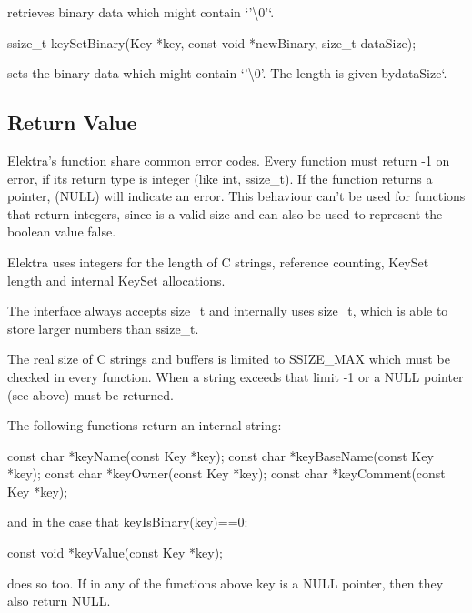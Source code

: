 retrieves binary data which might contain `'\textbackslash{}0'`. \begin{DoxyVerb}    ssize_t keySetBinary(Key *key, const void *newBinary, size_t dataSize);
\end{DoxyVerb}


sets the binary data which might contain `'\textbackslash{}0'{\ttfamily . The length is given by}data\+Size`.

\subsection*{Return Value}

Elektra's function share common error codes. Every function must return {\ttfamily -\/1} on error, if its return type is integer (like {\ttfamily int}, {\ttfamily ssize\+\_\+t}). If the function returns a pointer, {} ({\ttfamily N\+U\+L\+L}) will indicate an error. This behaviour can't be used for functions that return integers, since {} is a valid size and can also be used to represent the boolean value {\ttfamily false}.

Elektra uses integers for the length of C strings, reference counting, {\ttfamily Key\+Set} length and internal {\ttfamily Key\+Set} allocations.

The interface always accepts {\ttfamily size\+\_\+t} and internally uses {\ttfamily size\+\_\+t}, which is able to store larger numbers than {\ttfamily ssize\+\_\+t}.

The real size of C strings and buffers is limited to {\ttfamily S\+S\+I\+Z\+E\+\_\+\+M\+A\+X} which must be checked in every function. When a string exceeds that limit {\ttfamily -\/1} or a {\ttfamily N\+U\+L\+L} pointer (see above) must be returned.

The following functions return an internal string\+: \begin{DoxyVerb}    const char *keyName(const Key *key);
    const char *keyBaseName(const Key *key);
    const char *keyOwner(const Key *key);
    const char *keyComment(const Key *key);
\end{DoxyVerb}


and in the case that {\ttfamily key\+Is\+Binary(key)==0}\+: \begin{DoxyVerb}    const void *keyValue(const Key *key);
\end{DoxyVerb}


does so too. If in any of the functions above {\ttfamily key} is a {\ttfamily N\+U\+L\+L} pointer, then they also return {\ttfamily N\+U\+L\+L}.

